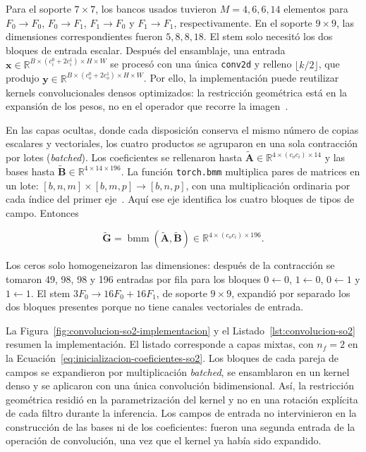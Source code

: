 Para el soporte \(7\times7\), los bancos usados tuvieron \(M=4,6,6,14\)
elementos para \(F_0\!\to F_0\), \(F_0\!\to F_1\),
\(F_1\!\to F_0\) y \(F_1\!\to F_1\), respectivamente. En el soporte
\(9\times9\), las dimensiones correspondientes fueron \(5,8,8,18\). El stem
solo necesitó los dos bloques de entrada escalar. Después del ensamblaje, una
entrada \(\mathbf x\in\mathbb{R}^{B\times(c_i^0+2c_i^1)\times H\times W}\)
se procesó con una única \texttt{conv2d} y relleno
\(\lfloor k/2\rfloor\), que produjo
\(\mathbf y\in\mathbb{R}^{B\times(c_o^0+2c_o^1)\times H\times W}\). Por ello,
la implementación puede reutilizar kernels convolucionales densos optimizados:
la restricción geométrica está en la expansión de los pesos, no en el operador
que recorre la imagen~\cite{weiler_general_2019}.

En las capas ocultas, donde cada disposición conserva el mismo número de
copias escalares y vectoriales, los cuatro productos se agruparon en una sola
contracción por lotes (\emph{batched}). Los coeficientes se rellenaron hasta
\(\widetilde{\mathbf A}\in\mathbb R^{4\times(c_oc_i)\times14}\) y las bases
hasta \(\widetilde{\mathbf B}\in\mathbb R^{4\times14\times196}\). La función
\texttt{torch.bmm} multiplica pares de matrices en un lote:
\([b,n,m]\times[b,m,p]\to[b,n,p]\), con una multiplicación ordinaria por cada
índice del primer eje~\cite{pytorch_bmm}. Aquí ese eje identifica los cuatro
bloques de tipos de campo. Entonces

\begin{equation}
    \widetilde{\mathbf G}
    =\operatorname{bmm}(\widetilde{\mathbf A},\widetilde{\mathbf B})
    \in\mathbb R^{4\times(c_oc_i)\times196}.
    \label{eq:bmm-cuatro-bloques-f01}
\end{equation}

Los ceros solo homogeneizaron las dimensiones: después de la contracción se
tomaron 49, 98, 98 y 196 entradas por fila para los bloques
\(0\leftarrow0\), \(1\leftarrow0\), \(0\leftarrow1\) y
\(1\leftarrow1\). El stem \(3F_0\to16F_0+16F_1\), de soporte
\(9\times9\), expandió por separado los dos bloques presentes porque no tiene
canales vectoriales de entrada.

La Figura~\ref{fig:convolucion-so2-implementacion} y el
Listado~\ref{lst:convolucion-so2} resumen la implementación. El listado
corresponde a capas mixtas, con \(n_f=2\) en la
Ecuación~\eqref{eq:inicializacion-coeficientes-so2}. Los bloques de
cada pareja de campos se expandieron por multiplicación \emph{batched}, se ensamblaron
en un kernel denso y se aplicaron con una única convolución bidimensional. Así,
la restricción geométrica residió en la parametrización del kernel y no en una
rotación explícita de cada filtro durante la inferencia. Los campos de entrada
no intervinieron en la construcción de las bases ni de los coeficientes: fueron
una segunda entrada de la operación de convolución, una vez que el kernel ya
había sido expandido.

